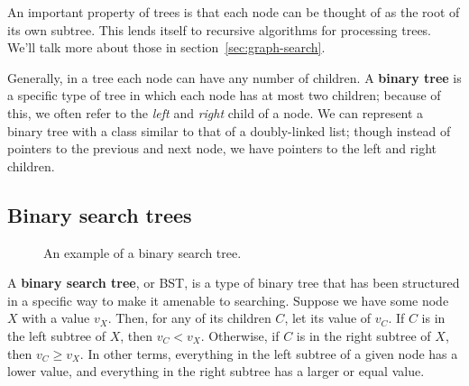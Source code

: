 An important property of trees is that each node can be thought of as the root of its own subtree. This lends itself to recursive algorithms for processing trees. We'll talk more about those in section~\ref{sec:graph-search}.

Generally, in a tree each node can have any number of children. A \textbf{binary tree} is a specific type of tree in which each node has at most two children; because of this, we often refer to the \textit{left} and \textit{right} child of a node. We can represent a binary tree with a class similar to that of a doubly-linked list; though instead of pointers to the previous and next node, we have pointers to the left and right children.


\subsection{Binary search trees} \label{sec:bst}

\begin{figure}[b]
\centering
{}
\caption{An example of a binary search tree.}
\label{fig:tree2}
\end{figure}

A \textbf{binary search tree}, or BST, is a type of binary tree that has been structured in a specific way to make it amenable to searching. Suppose we have some node $X$ with a value $v_X$. Then, for any of its children $C$, let its value of $v_C$. If $C$ is in the left subtree of $X$, then $v_C < v_X$. Otherwise, if $C$ is in the right subtree of $X$, then $v_C \geq v_X$. In other terms, everything in the left subtree of a given node has a lower value, and everything in the right subtree has a larger or equal value.


